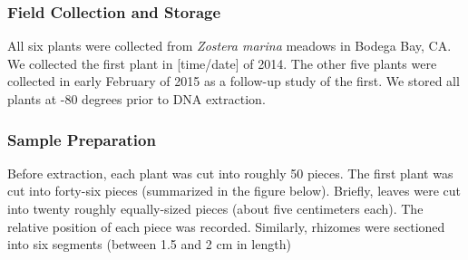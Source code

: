 
\subsubsection{Field Collection and Storage}

All six plants were collected from \textit{Zostera marina} meadows in Bodega Bay, CA. We collected the first plant in [time/date] of 2014. The other five plants were collected in early February of 2015 as a follow-up study of the first. We stored all plants at -80 degrees prior to DNA extraction. 

\subsubsection{Sample Preparation}

Before extraction, each plant was cut into roughly 50 pieces. The first plant was cut into forty-six pieces (summarized in the figure below). Briefly, leaves were cut into twenty roughly equally-sized pieces (about five centimeters each). The relative position of each piece was recorded. Similarly, rhizomes were sectioned into six segments (between 1.5 and 2 cm in length)